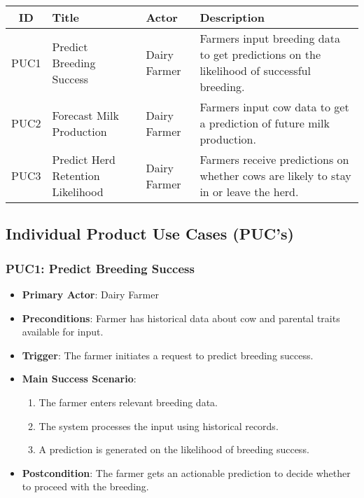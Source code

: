 \documentclass[12pt]{article}
\begin{document}
\begin{table}[h!]
\centering
\begin{tabularx}{\textwidth}{|c|l|l|X|}
    \hline
    \textbf{ID} & \textbf{Title} & \textbf{Actor} & \textbf{Description} \\
    \hline
    PUC1 & Predict Breeding Success & Dairy Farmer & Farmers input breeding 
    data to get predictions on the likelihood of successful breeding. \\
    \hline
    PUC2 & Forecast Milk Production & Dairy Farmer & Farmers input cow data 
    to get a prediction of future milk production. \\
    \hline
    PUC3 & Predict Herd Retention Likelihood & Dairy Farmer & Farmers receive 
    predictions on whether cows are likely to stay in or leave the herd. \\
    \hline
\end{tabularx}
\end{table}


\subsection{Individual Product Use Cases (PUC's)}

\subsubsection{PUC1: Predict Breeding Success}
\begin{itemize}
    \item \textbf{Primary Actor}: Dairy Farmer
    \item \textbf{Preconditions}: Farmer has historical data about cow and 
    parental traits available for input.
    \item \textbf{Trigger}: The farmer initiates a request to predict 
    breeding success.
    \item \textbf{Main Success Scenario}:
    \begin{enumerate}
        \item The farmer enters relevant breeding data.
        \item The system processes the input using historical records.
        \item A prediction is generated on the likelihood of breeding success.
    \end{enumerate}
    \item \textbf{Postcondition}: The farmer gets an actionable prediction 
    to decide whether to proceed with the breeding.
\end{itemize}
\end{document}
